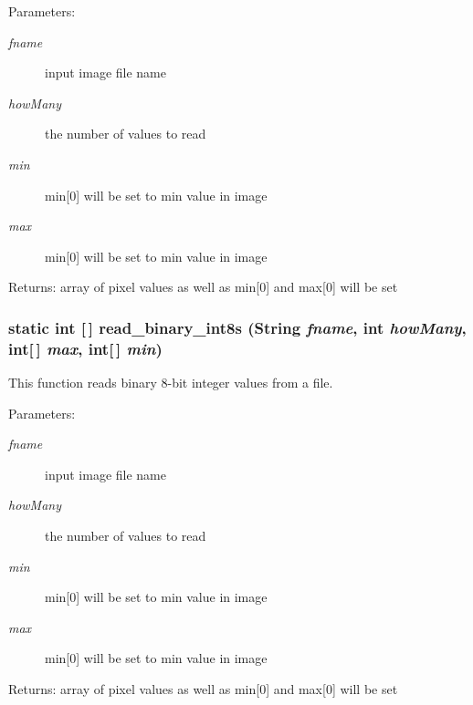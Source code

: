 \begin{Desc}
\item[Parameters:]
\begin{description}
\item[{\em fname}]input image file name \item[{\em how\-Many}]the number of values to read \item[{\em min}]min[0] will be set to min value in image \item[{\em max}]min[0] will be set to min value in image\end{description}
\end{Desc}
\begin{Desc}
\item[Returns:]array of pixel values as well as min[0] and max[0] will be set \end{Desc}
\subsubsection{\setlength{\rightskip}{0pt plus 5cm}static int [$\,$] read\_\-binary\_\-int8s (String {\em fname}, int {\em how\-Many}, int[$\,$] {\em max}, int[$\,$] {\em min})\hspace{0.3cm}{\tt  [static, protected]}}\label{class_c_s_image_viewer_1_1pnm_helper_f566cc8ea17d5d3a35d8e49a747c9fb8}


This function reads binary 8-bit integer values from a file. 

\begin{Desc}
\item[Parameters:]
\begin{description}
\item[{\em fname}]input image file name \item[{\em how\-Many}]the number of values to read \item[{\em min}]min[0] will be set to min value in image \item[{\em max}]min[0] will be set to min value in image\end{description}
\end{Desc}
\begin{Desc}
\item[Returns:]array of pixel values as well as min[0] and max[0] will be set \end{Desc}
